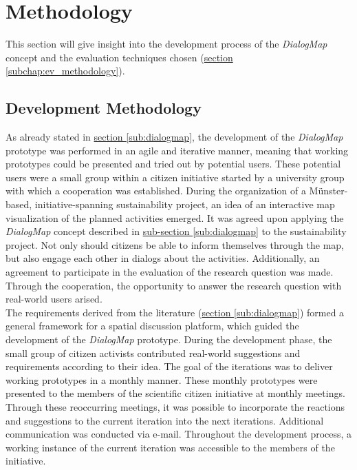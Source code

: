 \section{Methodology}
\label{chap:methodology}
This section will give insight into the development process of the \textit{DialogMap} concept and the evaluation techniques chosen (\hyperref[subchap:ev_methodology]{section \ref{subchap:ev_methodology}}).

\subsection{Development Methodology}
As already stated in \hyperref[sub:dialogmap]{section \ref{sub:dialogmap}}, the development of the \textit{DialogMap} prototype was performed in an agile and iterative manner, meaning that working prototypes could be presented and tried out by potential users. These potential users were a small group within a citizen initiative started by a university group with which a cooperation was established. During the organization of a Münster-based, initiative-spanning sustainability project, an idea of an interactive map visualization of the planned activities emerged. It was agreed upon applying the \textit{DialogMap} concept described in \hyperref[sub:dialogmap]{sub-section \ref{sub:dialogmap}} to the sustainability project. Not only should citizens be able to inform themselves through the map, but also engage each other in dialogs about the activities. Additionally, an agreement to participate in the evaluation of the research question was made. Through the cooperation, the opportunity to answer the research question with real-world users arised.\\
The requirements derived from the literature (\hyperref[sub:dialogmap]{section \ref{sub:dialogmap}}) formed a general framework for a spatial discussion platform, which guided the development of the \textit{DialogMap} prototype. During the development phase, the small group of citizen activists contributed real-world suggestions and requirements according to their idea. The goal of the iterations was to deliver working prototypes in a monthly manner. These monthly prototypes were presented to the members of the scientific citizen initiative at monthly meetings. Through these reoccurring meetings, it was possible to incorporate the reactions and suggestions to the current iteration into the next iterations. Additional communication was conducted via e-mail. Throughout the development process, a working instance of the current iteration was accessible to the members of the initiative.

